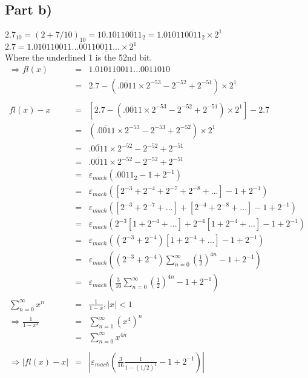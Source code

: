 \documentclass[12pt]{article}
\begin{document}
\subsection*{Part b)}
\(2.7_{10} = (2 + 7/10)_{10} = 10.1011\overline{0011}_{2} = 1.01011\overline{0011}_{2}\times2^{1}\)
\\
\(2.7 = 1.010110011...001100{\underline1}1...\times2^1\)\\
Where the underlined 1 is the 52nd bit.\\
\begin{eqnarray*}
\Rightarrow fl(x) & = & 1.010110011...0011010\\
& = & 2.7 - (\overline{.0011}\times2^{-53} - 2^{-52} + 2^{-51})\times2^{1}\\
\\
fl(x) - x & = & [2.7 - (\overline{.0011}\times2^{-53} - 2^{-52} + 2^{-51})\times2^{1}] - 2.7\\
& = & (\overline{.0011}\times2^{-53} - 2^{-53} + 2^{-52})\times2^{1}\\
& = & \overline{.0011}\times2^{-52} - 2^{-52} + 2^{-51}\\
& = & \overline{.0011}\times2^{-52} - 2^{-52} + 2^{-51}\\
& = & \varepsilon_{mach}(\overline{.0011}_{2} - 1 + 2^{-1})\\
& = & \varepsilon_{mach}([2^{-3} + 2^{-4} + 2^{-7} + 2^{-8} + ...] - 1 + 2^{-1})\\
& = & \varepsilon_{mach}([2^{-3} + 2^{-7} + ...] + [2^{-4} + 2^{-8} + ...] - 1 + 2^{-1})\\
& = & \varepsilon_{mach}(2^{-3}[1 + 2^{-4} + ...] + 2^{-4}[1 + 2^{-4} + ...] - 1 + 2^{-1})\\
& = & \varepsilon_{mach}((2^{-3} + 2^{-4})[1 + 2^{-4} + ...] - 1 + 2^{-1})\\
& = & \varepsilon_{mach}((2^{-3} + 2^{-4})\sum_{n=0}^{\infty} (\frac{1}{2})^{4n} - 1 + 2^{-1})\\
& = & \varepsilon_{mach}(\frac{3}{16}\sum_{n=0}^{\infty} (\frac{1}{2})^{4n} - 1 + 2^{-1})\\
\\
\sum_{n=0}^{\infty} x^{n} & = & \frac{1}{1-x}, \left|x\right| < 1\\
\Rightarrow\frac{1}{1-x^{4}} & = & \sum_{n=1}^{\infty} (x^{4})^{n}\\
& = &\sum_{n=0}^{\infty} x^{4n}\\
\\
\Rightarrow \left|fl(x) - x\right| & = & \left|\varepsilon_{mach}(\frac{3}{16}\frac{1}{1-(1/2)^{4}} - 1 + 2^{-1})\right|\\

\end{eqnarray*}
\end{document}

